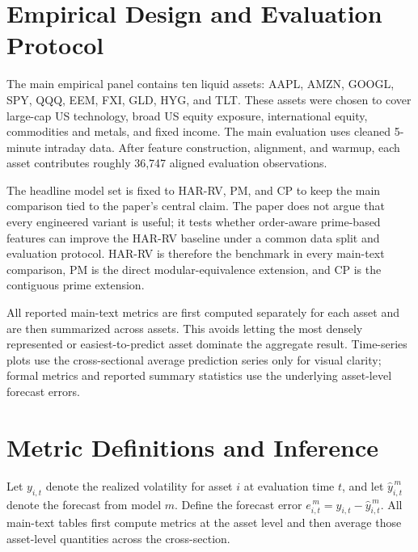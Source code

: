 \documentclass[11pt,a4paper]{article}
\begin{document}
\section{Empirical Design and Evaluation Protocol}

\noindent
The main empirical panel contains ten liquid assets: AAPL, AMZN, GOOGL, SPY, QQQ, EEM, FXI, GLD, HYG, and TLT. These assets were chosen to cover large-cap US technology, broad US equity exposure, international equity, commodities and metals, and fixed income. The main evaluation uses cleaned 5-minute intraday data. After feature construction, alignment, and warmup, each asset contributes roughly 36,747 aligned evaluation observations.

\noindent
The headline model set is fixed to HAR-RV, PM, and CP to keep the main comparison tied to the paper's central claim. The paper does not argue that every engineered variant is useful; it tests whether order-aware prime-based features can improve the HAR-RV baseline under a common data split and evaluation protocol. HAR-RV is therefore the benchmark in every main-text comparison, PM is the direct modular-equivalence extension, and CP is the contiguous prime extension.

\noindent
All reported main-text metrics are first computed separately for each asset and are then summarized across assets. This avoids letting the most densely represented or easiest-to-predict asset dominate the aggregate result. Time-series plots use the cross-sectional average prediction series only for visual clarity; formal metrics and reported summary statistics use the underlying asset-level forecast errors.

\section{Metric Definitions and Inference}

\noindent
Let $y_{i,t}$ denote the realized volatility for asset $i$ at evaluation time $t$, and let $\hat{y}^{\,m}_{i,t}$ denote the forecast from model $m$. Define the forecast error $e^{\,m}_{i,t} = y_{i,t} - \hat{y}^{\,m}_{i,t}$. All main-text tables first compute metrics at the asset level and then average those asset-level quantities across the cross-section.
\end{document}

